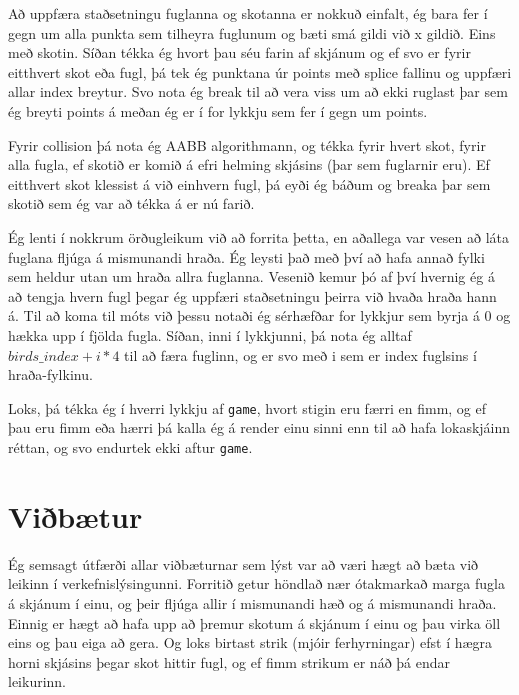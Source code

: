 \documentclass{article}
\begin{document}
	Að uppfæra staðsetningu fuglanna og skotanna er nokkuð einfalt, ég 
	bara fer í gegn um alla punkta sem tilheyra fuglunum og bæti smá gildi 
	við x gildið. Eins með skotin. Síðan tékka ég hvort þau séu farin af 
	skjánum og ef svo er fyrir eitthvert skot eða fugl, þá tek ég 
	punktana úr points með splice fallinu og uppfæri allar index breytur. 
	Svo nota ég break til að vera viss um að ekki ruglast þar sem 
	ég breyti points á meðan ég er í for lykkju sem fer í gegn um points.

	Fyrir collision þá nota ég AABB algorithmann, og tékka fyrir hvert 
	skot, fyrir alla fugla, ef skotið er komið á efri helming skjásins 
	(þar sem fuglarnir eru). Ef eitthvert skot klessist á við einhvern 
	fugl, þá eyði ég báðum og breaka þar sem skotið sem ég var að tékka 
	á er nú farið.

	Ég lenti í nokkrum örðugleikum við að forrita þetta, en aðallega 
	var vesen að láta fuglana fljúga á mismunandi hraða. Ég leysti það 
	með því að hafa annað fylki sem heldur utan um hraða allra fuglanna. 
	Vesenið kemur þó af því hvernig ég á að tengja hvern fugl þegar ég 
	uppfæri staðsetningu þeirra við hvaða hraða hann á. Til að koma til 
	móts við þessu notaði ég sérhæfðar for lykkjur sem byrja á 0 og hækka 
	upp í fjölda fugla. Síðan, inni í lykkjunni, þá nota ég alltaf 
	$birds\_index + i*4$ til að færa fuglinn, og er svo með i sem er index 
	fuglsins í hraða-fylkinu.

	Loks, þá tékka ég í hverri lykkju af \texttt{game}, hvort stigin eru færri en 
	fimm, og ef þau eru fimm eða hærri þá kalla ég á render einu sinni enn 
	til að hafa lokaskjáinn réttan, og svo endurtek ekki aftur \texttt{game}.

	\part{Viðbætur}

	Ég semsagt útfærði allar viðbæturnar sem lýst var að væri hægt að 
	bæta við leikinn í verkefnislýsingunni. Forritið getur höndlað 
	nær ótakmarkað marga fugla á skjánum í einu, og þeir fljúga allir í 
	mismunandi hæð og á mismunandi hraða. Einnig er hægt að hafa upp að 
	þremur skotum á skjánum í einu og þau virka öll eins og þau eiga að 
	gera. Og loks birtast strik (mjóir ferhyrningar) efst í hægra horni 
	skjásins þegar skot hittir fugl, og ef fimm strikum er náð þá endar 
	leikurinn.
\end{document}
